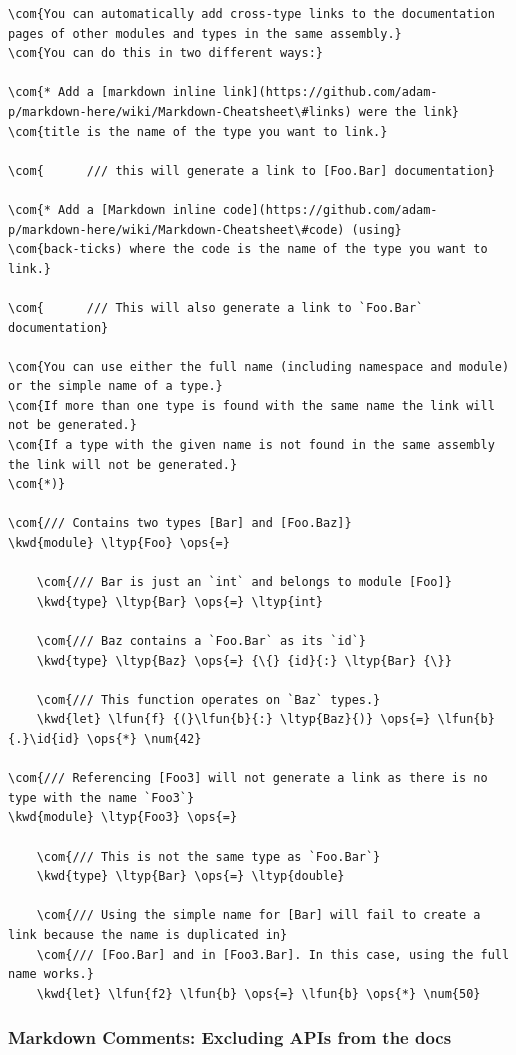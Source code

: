 \documentclass{article}
\newcommand{\id}[1]{\textcolor{black}{#1}}
\newcommand{\com}[1]{\textcolor{officegreen}{#1}}
\newcommand{\kwd}[1]{\textcolor{navy}{#1}}
\newcommand{\num}[1]{\textcolor{officegreen}{#1}}
\newcommand{\ops}[1]{\textcolor{purple}{#1}}
\begin{document}
\begin{Verbatim}[commandchars=\\\{\}]
\com{You can automatically add cross-type links to the documentation pages of other modules and types in the same assembly.}
\com{You can do this in two different ways:}

\com{* Add a [markdown inline link](https://github.com/adam-p/markdown-here/wiki/Markdown-Cheatsheet\#links) were the link}
\com{title is the name of the type you want to link.}

\com{      /// this will generate a link to [Foo.Bar] documentation}

\com{* Add a [Markdown inline code](https://github.com/adam-p/markdown-here/wiki/Markdown-Cheatsheet\#code) (using}
\com{back-ticks) where the code is the name of the type you want to link.}

\com{      /// This will also generate a link to `Foo.Bar` documentation}

\com{You can use either the full name (including namespace and module) or the simple name of a type.}
\com{If more than one type is found with the same name the link will not be generated.}
\com{If a type with the given name is not found in the same assembly the link will not be generated.}
\com{*)}

\com{/// Contains two types [Bar] and [Foo.Baz]}
\kwd{module} \ltyp{Foo} \ops{=}

    \com{/// Bar is just an `int` and belongs to module [Foo]}
    \kwd{type} \ltyp{Bar} \ops{=} \ltyp{int}

    \com{/// Baz contains a `Foo.Bar` as its `id`}
    \kwd{type} \ltyp{Baz} \ops{=} {\{} {id}{:} \ltyp{Bar} {\}}

    \com{/// This function operates on `Baz` types.}
    \kwd{let} \lfun{f} {(}\lfun{b}{:} \ltyp{Baz}{)} \ops{=} \lfun{b}{.}\id{id} \ops{*} \num{42}

\com{/// Referencing [Foo3] will not generate a link as there is no type with the name `Foo3`}
\kwd{module} \ltyp{Foo3} \ops{=}

    \com{/// This is not the same type as `Foo.Bar`}
    \kwd{type} \ltyp{Bar} \ops{=} \ltyp{double}

    \com{/// Using the simple name for [Bar] will fail to create a link because the name is duplicated in}
    \com{/// [Foo.Bar] and in [Foo3.Bar]. In this case, using the full name works.}
    \kwd{let} \lfun{f2} \lfun{b} \ops{=} \lfun{b} \ops{*} \num{50}
\end{Verbatim}

\subsubsection*{Markdown Comments: Excluding APIs from the docs}
\end{document}
